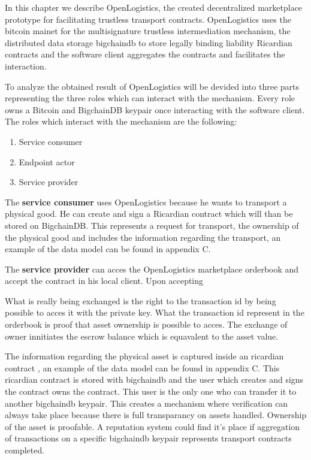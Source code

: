In this chapter we describe OpenLogistics, the created decentralized  marketplace prototype for facilitating trustless transport contracts. OpenLogistics uses the bitcoin mainet for the multisignature trustless intermediation mechanism, the distributed data storage bigchaindb to store legally binding liability Ricardian contracts and the software client aggregates the contracts and facilitates the interaction. \par
To analyze the obtained result of OpenLogistics will be devided into three parts representing the three roles which can interact with the mechanism. Every role owns a Bitcoin and BigchainDB keypair once interacting with the software client. The roles which interact with the mechanism are the following:
\begin{enumerate}
  \item Service consumer
  \item Endpoint actor
  \item Service provider
\end{enumerate}
The \textbf{service consumer} uses OpenLogistics because he wants to transport a physical good. He can create and sign a Ricardian contract which will than be stored on BigchainDB. This represents a request for transport, the ownership of the physical good and includes the information regarding the transport, an example of the data model can be found in appendix C. \par
The \textbf{service provider} can acces the OpenLogistics marketplace orderbook and accept the contract in his local client. Upon accepting

What is really being exchanged is the right to the transaction id by being possible to acces it with the private key. What the transaction id represent in the orderbook is proof that asset ownership is possible to acces. The exchange of owner innitiates the escrow balance which is equavalent to the asset value.

The information regarding the physical asset is captured inside an ricardian contract \cite{}, an example of the data model can be found in appendix C. This ricardian contract is stored with bigchaindb and the user which creates and signs the contract owns the contract. This user is the only one who can transfer it to another bigchaindb keypair. This creates a mechanism where verification can always take place because there is full transparancy on assets handled. Ownership of the asset is proofable. A reputation system could find it's place if aggregation of transactions on a specific bigchaindb keypair represents transport contracts completed.

